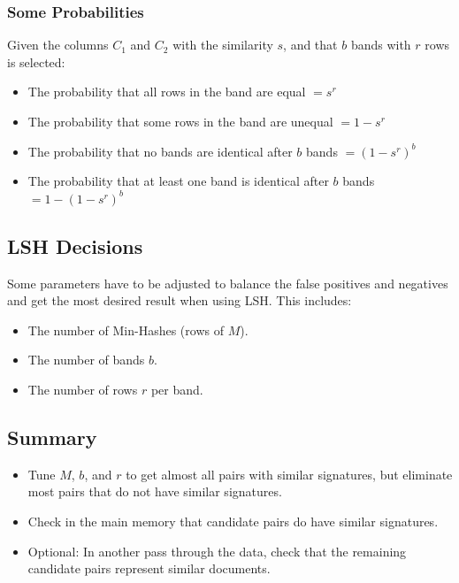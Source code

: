 \subsubsection{Some Probabilities}
Given the columns $C_1$ and $C_2$ with the similarity $s$, and that $b$ bands with $r$ rows is selected:
\begin{itemize}
 \item The probability that all rows in the band are equal $ = s^r$
 \item The probability that some rows in the band are unequal $ = 1 - s^r$
 \item The probability that no bands are identical after $b$ bands $ = (1-s^r)^b$
 \item The probability that at least one band is identical after $b$ bands $ = 1 - (1-s^r)^b$
\end{itemize}

\subsection{LSH Decisions}
Some parameters have to be adjusted to balance the false positives and negatives and get the most desired result when using LSH. This includes:
\begin{itemize}
 \item The number of Min-Hashes (rows of $M$).
 \item The number of bands $b$.
 \item The number of rows $r$ per band.
\end{itemize}

\subsection{Summary}
\begin{itemize}
 \item Tune $M$, $b$, and $r$ to get almost all pairs with similar signatures, but eliminate most pairs that do not have similar signatures.
 \item Check in the main memory that candidate pairs do have similar signatures.
 \item Optional: In another pass through the data, check that the remaining candidate pairs represent similar documents.
\end{itemize}
